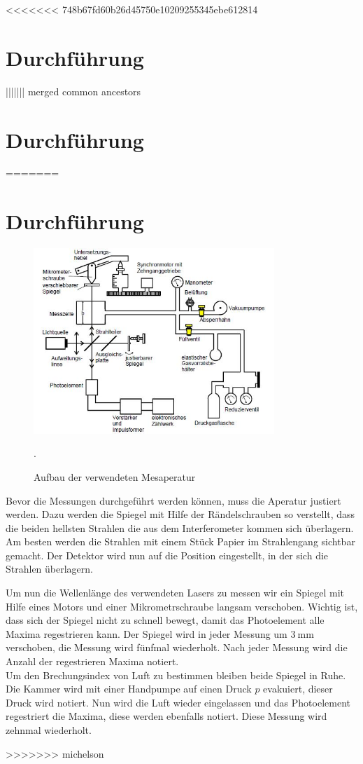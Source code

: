 <<<<<<< 748b67fd60b26d45750e10209255345ebe612814
\section{Durchführung}
\label{sec:Durchführung}
||||||| merged common ancestors
\section{Durchführung}
\label{sec:Durchführung}
=======
\section{Durchführung}
\begin{figure}[H]
  \centering
  \includegraphics[height=7cm]{aufbau.JPG}
  \caption{Aufbau der verwendeten Mesaperatur}
  \label{fig:aufbau}
  \cite{skript}.
\end{figure}
Bevor die Messungen durchgeführt werden können, muss die Aperatur justiert werden.
Dazu werden die Spiegel mit Hilfe der Rändelschrauben so verstellt, dass die beiden hellsten
Strahlen die aus dem Interferometer kommen sich überlagern. Am besten werden die Strahlen mit
einem Stück Papier im Strahlengang sichtbar gemacht. Der Detektor wird nun auf die
Position eingestellt, in der sich die Strahlen überlagern.

Um nun die Wellenlänge des verwendeten Lasers zu messen wir ein Spiegel mit Hilfe eines Motors
und einer Mikrometrschraube langsam verschoben. Wichtig ist, dass sich der Spiegel nicht zu schnell
bewegt, damit das Photoelement alle Maxima regestrieren kann. Der Spiegel wird in jeder
Messung um $\SI{3}{\mm}$ verschoben, die Messung wird fünfmal wiederholt. Nach jeder Messung
wird die Anzahl der regestrieren Maxima notiert.\\
Um den Brechungsindex von Luft zu bestimmen bleiben beide Spiegel in Ruhe.
Die Kammer wird mit einer Handpumpe auf einen Druck $p$ evakuiert, dieser Druck wird notiert.
Nun wird die Luft wieder eingelassen und das Photoelement regestriert die Maxima, diese werden
ebenfalls notiert. Diese Messung wird zehnmal wiederholt.



\label{sec:Durchführung}
>>>>>>> michelson
